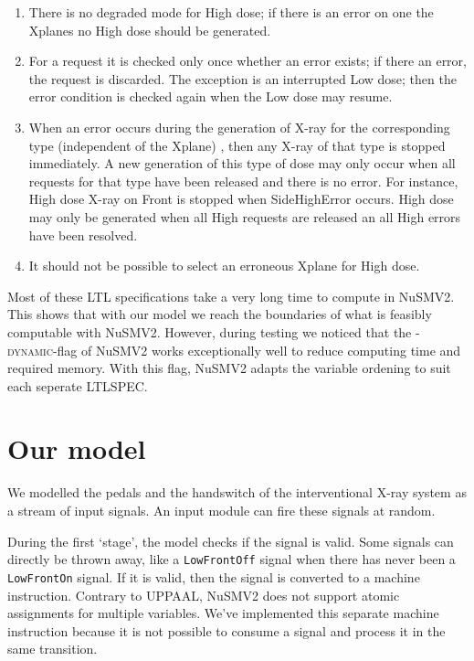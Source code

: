 \documentclass[a4paper,10pt]{article}
\begin{document}
\begin{enumerate}
\begin{enumerate}
			\end{enumerate}
		\item There is no degraded mode for High dose; if there is an error on one the Xplanes no High dose should be generated.
		\item For a request it is checked only once whether an error exists; if there an error, the request is discarded. The exception is an interrupted Low dose; then the error condition is checked again when the Low dose may resume.
		\item When an error occurs during the generation of X-ray for the corresponding type (independent of the Xplane) , then any X-ray of that type is stopped immediately. A new generation of this type of dose may only occur when all requests for that type have been released and there is no error. For instance, High dose X-ray on Front is stopped when SideHighError occurs. High dose may only be generated when all High requests are released an all High errors have been resolved.
		\item It should not be possible to select an erroneous Xplane for High dose.
	\end{enumerate}
	
	Most of these LTL specifications take a very long time to compute in NuSMV2.
	This shows that with our model we reach the boundaries of what is feasibly computable with NuSMV2.
	However, during testing we noticed that the \textsc{-dynamic}-flag of NuSMV2 works exceptionally well to reduce computing time and required memory.
	With this flag, NuSMV2 adapts the variable ordening to suit each seperate LTLSPEC.
	
	\section{Our model}
	We modelled the pedals and the handswitch of the interventional X-ray system as a stream of input signals.
	An input module can fire these signals at random.
	
	During the first `stage', the model checks if the signal is valid.
	Some signals can directly be thrown away, like a \texttt{LowFrontOff} signal when there has never been a \texttt{LowFrontOn} signal.
	If it is valid, then the signal is converted to a machine instruction.
	Contrary to UPPAAL, NuSMV2 does not support atomic assignments for multiple variables.
	We've implemented this separate machine instruction because it is not possible to consume a signal and process it in the same transition.
	
\end{document}
